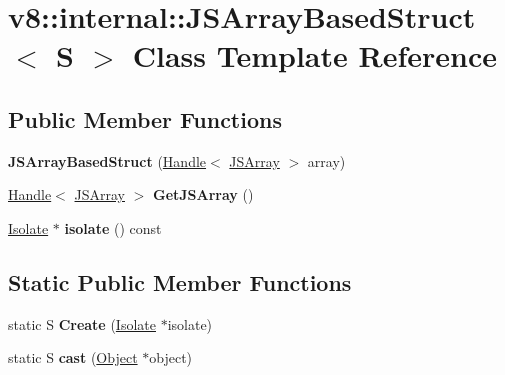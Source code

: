 \hypertarget{classv8_1_1internal_1_1_j_s_array_based_struct}{}\section{v8\+:\+:internal\+:\+:J\+S\+Array\+Based\+Struct$<$ S $>$ Class Template Reference}
\label{classv8_1_1internal_1_1_j_s_array_based_struct}
\subsection*{Public Member Functions}
\begin{DoxyCompactItemize}
\item 
\hypertarget{classv8_1_1internal_1_1_j_s_array_based_struct_a1f5243bf50417d71e7e6d1f1eb4bc5dd}{}{\bfseries J\+S\+Array\+Based\+Struct} (\hyperlink{classv8_1_1internal_1_1_handle}{Handle}$<$ \hyperlink{classv8_1_1internal_1_1_j_s_array}{J\+S\+Array} $>$ array)\label{classv8_1_1internal_1_1_j_s_array_based_struct_a1f5243bf50417d71e7e6d1f1eb4bc5dd}

\item 
\hypertarget{classv8_1_1internal_1_1_j_s_array_based_struct_a6a184740e66c0839663d48f033912937}{}\hyperlink{classv8_1_1internal_1_1_handle}{Handle}$<$ \hyperlink{classv8_1_1internal_1_1_j_s_array}{J\+S\+Array} $>$ {\bfseries Get\+J\+S\+Array} ()\label{classv8_1_1internal_1_1_j_s_array_based_struct_a6a184740e66c0839663d48f033912937}

\item 
\hypertarget{classv8_1_1internal_1_1_j_s_array_based_struct_a5ab349ea3517e15e70f0813b89b428df}{}\hyperlink{classv8_1_1internal_1_1_isolate}{Isolate} $\ast$ {\bfseries isolate} () const \label{classv8_1_1internal_1_1_j_s_array_based_struct_a5ab349ea3517e15e70f0813b89b428df}

\end{DoxyCompactItemize}
\subsection*{Static Public Member Functions}
\begin{DoxyCompactItemize}
\item 
\hypertarget{classv8_1_1internal_1_1_j_s_array_based_struct_a42478b81aac387c666de3c8be169f71c}{}static S {\bfseries Create} (\hyperlink{classv8_1_1internal_1_1_isolate}{Isolate} $\ast$isolate)\label{classv8_1_1internal_1_1_j_s_array_based_struct_a42478b81aac387c666de3c8be169f71c}

\item 
\hypertarget{classv8_1_1internal_1_1_j_s_array_based_struct_a1158491b87aaf389cfcb8803c4a6400e}{}static S {\bfseries cast} (\hyperlink{classv8_1_1internal_1_1_object}{Object} $\ast$object)\label{classv8_1_1internal_1_1_j_s_array_based_struct_a1158491b87aaf389cfcb8803c4a6400e}

\end{DoxyCompactItemize}
